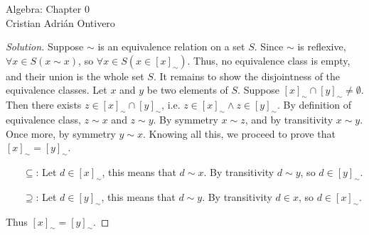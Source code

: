 \documentclass{article}
\theoremstyle{definition}
\theoremstyle{definition}
\newenvironment{solution}{%
  \begin{proof}[Solution]
  \vspace{-8px}
  \setlength{\parskip}{4px}
  \setlength{\parindent}{0px}
}{
  \end{proof}
}
\begin{document}
\begin{center}
  {\LARGE Algebra: Chapter 0}\\[.2cm]
  Cristian Adrián Ontivero \\[.05cm]%
\end{center}

\begin{solution}
Suppose $\sim$ is an equivalence relation on a set $S$.
Since $\sim$ is reflexive, $\forall x \in S (x \sim x) $, so $\forall x\in S
(x \in {[x]}_{\sim})$. Thus, no equivalence class is empty, and their union is
the whole set $S$.  It remains to show the disjointness of the equivalence
classes.  Let $x$ and $y$ be two elements of $S$. Suppose ${[x]}_{\sim} \cap
{[y]}_{\sim} \neq \emptyset$. Then there exists $z \in {[x]}_{\sim} \cap
{[y]}_{\sim}$, i.e. $z \in {[x]}_{\sim} \wedge z \in {[y]}_{\sim}$. By
definition of equivalence class, $z \sim x$ and $z \sim y$. By symmetry $x \sim
z$, and by transitivity $x \sim y$. Once more, by symmetry $y \sim x$. Knowing
all this, we proceed to prove that ${[x]}_{\sim} = {[y]}_{\sim}$.
\begin{itemize}
\item[$\subseteq$:] Let $d \in {[x]}_{\sim}$, this means that $d \sim x$. By
transitivity $d \sim y$, so $d \in {[y]}_{\sim}$.
\item[$\supseteq$:] Let $d \in {[y]}_{\sim}$, this means that $d \sim y$. By
transitivity $d \in x$, so $d \in {[x]}_{\sim}$.
\end{itemize}

Thus ${[x]}_{\sim} = {[y]}_{\sim}$.
\end{solution}
\end{document}
